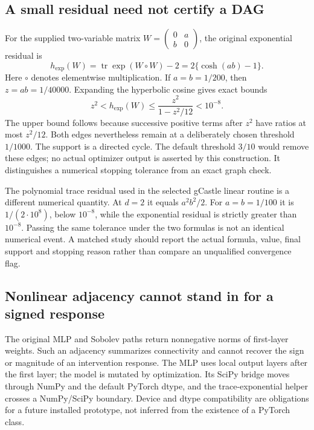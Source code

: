 \subsection{A small residual need not certify a DAG}
\label{exec23:notears-residual}
For the supplied two-variable matrix
$W=\left(\begin{smallmatrix}0&a\\b&0\end{smallmatrix}\right)$,
the original exponential residual is
\begin{equation}
 h_{\exp}(W)=\operatorname{tr}\exp(W\circ W)-2
            =2\{\cosh(ab)-1\}.
 \label{exec23:notears-cycle}
\end{equation}
Here $\circ$ denotes elementwise multiplication. If $a=b=1/200$,
then $z=ab=1/40000$. Expanding the hyperbolic cosine gives exact bounds
\begin{equation}
 z^2<h_{\exp}(W)\leq\frac{z^2}{1-z^2/12}<10^{-8}.
 \label{exec23:notears-bound}
\end{equation}
The upper bound follows because successive positive terms after $z^2$
have ratios at most $z^2/12$. Both edges nevertheless remain at a deliberately
chosen threshold $1/1000$. The support is a directed cycle. The default
threshold $3/10$ would remove these edges; no actual optimizer output is
asserted by this construction. It distinguishes a numerical stopping
tolerance from an exact graph check.
\citep{exec23_notears_source,exec23_notears_reference}

The polynomial trace residual used in the selected gCastle linear routine
is a different numerical quantity. At $d=2$ it equals $a^2b^2/2$.
For $a=b=1/100$ it is $1/(2\cdot10^8)$, below $10^{-8}$,
while the exponential residual is strictly greater than $10^{-8}$.
Passing the same tolerance under the two formulas is not an identical
numerical event. A matched study should report the actual formula, value,
final support and stopping reason rather than compare an unqualified
convergence flag.\citep{exec20_gcastle_source,exec23_notears_reference}

\subsection{Nonlinear adjacency cannot stand in for a signed response}
\label{exec23:notears-nonlinear}
The original MLP and Sobolev paths return nonnegative norms of first-layer
weights. Such an adjacency summarizes connectivity and cannot recover the
sign or magnitude of an intervention response. The MLP uses local output
layers after the first layer; the model is mutated by optimization. Its
SciPy bridge moves through NumPy and the default PyTorch dtype, and the
trace-exponential helper crosses a NumPy/SciPy boundary. Device and dtype
compatibility are obligations for a future installed prototype, not inferred
from the existence of a PyTorch class.\citep{exec23_notears_source}

